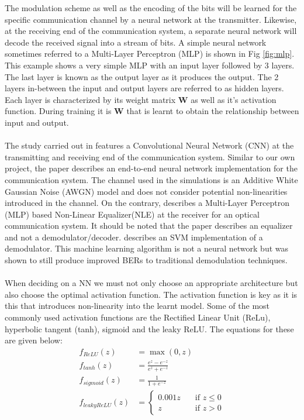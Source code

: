The modulation scheme as well as the encoding of the bits will be learned for the specific communication channel by a neural network at the transmitter. Likewise, at the receiving end of the communication system, a separate neural network will decode the received signal into a stream of bits. A simple neural network sometimes referred to a Multi-Layer Perceptron (MLP) is shown in Fig \ref{fig:mlp}. This example shows a very simple MLP with an input layer followed by 3 layers. The last layer is known as the output layer as it produces the output. The 2 layers in-between the input and output layers are referred to as hidden layers. Each layer is characterized by its weight matrix $\boldsymbol{W}$ as well as it's activation function. During training it is $\boldsymbol{W}$ that is learnt to obtain the relationship between input and output.
\\
\\
The study carried out in \autocite{8664650} features a Convolutional Neural Network (CNN) at the transmitting and receiving end of the communication system. Similar to our own project, the paper describes an end-to-end neural network implementation for the communication system. The channel used in the simulations is an Additive White Gaussian Noise (AWGN) model and does not consider potential non-linearities introduced in the channel. On the contrary, \autocite{6975096} describes a Multi-Layer Perceptron (MLP) based Non-Linear Equalizer(NLE) at the receiver for an optical communication system.  It should be noted that the paper describes an equalizer and not a demodulator/decoder. \autocite{8114893} describes an SVM implementation of a demodulator. This machine learning algorithm is not a neural network but was shown to still produce improved BERs to traditional demodulation techniques. 
\\
\\
When deciding on a NN we must not only choose an appropriate architecture but also choose the optimal activation function. The activation function is key as it is this that introduces non-linearity into the learnt model. Some of the most commonly used activation functions are the Rectified Linear Unit (ReLu), hyperbolic tangent (tanh), sigmoid and the leaky ReLU. The equations for these are given below:
\\
\begin{equation}
    \begin{split}
        f_{ReLU}(z) &= \max(0,z) \\
        f_{tanh}(z) &= \frac{e^{z}-e^{-z}}{e^{z}+e^{-z}} \\
        f_{sigmoid}(z) &= \frac{1}{1+e^{-z}} \\
        f_{leakyReLU}(z) &= 
        \begin{cases}
            0.001z \quad & \text{if $z\leq 0$} \\
            z \quad & \text{if $z>0$}
        \end{cases}
    \end{split}
\end{equation}

